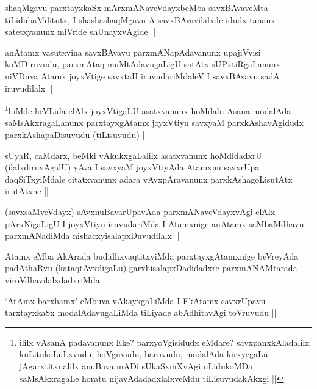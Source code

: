 \begin{artha}
shaqMgavu parxtayxkaSx mArxmANaveVdayxbeMba savxBAvaveMta tiLidubaMditutx, I shashashaqMgavu A savxBAvavilalxde idudx tananx satetxyanunx miVride shUnayxvAgide ||
\end{artha}

\begin{artha}
anAtamx vasutxvina savxBAvavu parxmANapAdavanunx upajiVvisi koMDiruvudu, parxmAtaq muMtAdavugaLigU satAtx sUPxtiRgaLanunx niVDuva Atamx joyxVtige savxtaH iruvudariMdaleV I savxBAvavu sadA iruvudilalx ||
\end{artha}

\begin{artha}
\footnote{ililx vAsanA padavanunx Eke? parxyoVgisidudx eMdare? savxpanxkAladalilx kuLitukoLuLxvudu, hoVguvudu, baruvudu, modalAda kirxyegaLu jAgarxtitxnalilx anuBava mADi sUkaSxmXvAgi uLidukoMDa saMsAkxragaLe horatu nijavAdadadxlalxveMdu tiLisuvudakAkxgi ||}hiMde heVLida elAlx joyxVtigaLU asatxvanunx hoMdalu Asana modalAda saMsAkxragaLanunx parxtayxgAtamx joyxVtiyu savxyaM parxkAshavAgidudx parxkAshapaDisuvudu (tiLisuvudu) ||
\end{artha}

\begin{artha}
sUyaR, caMdarx, beMki vAkukxgaLalilx asatxvanunx hoMdidadxrU (ilalxdiruvAgalU) yAva I savxyaM joyxVtiyAda Atamxnu savxrUpa daqSiTxyiMdale citatxvanunx adara vAyxpAravanunx parxkAshagoLisutAtx irutAtxne ||
\end{artha}

\begin{artha}
(savxsaMveVdayx) sAvxnuBavarUpavAda parxmANaveVdayxvAgi elAlx pArxNigaLigU I joyxVtiyu iruvudariMda I Atamxnige anAtamx saMbaMdhavu parxmANadiMda nishacxyisalapxDuvudilalx ||
\end{artha}

\begin{artha}
Atamx eMba AkArada budidhxvaqtitxyiMda parxtayxgAtamxnige beVreyAda padAthaRvu (kataqtAvxdigaLu) garxhisalapxDadidadxre parxmANAMtarada viroVdhavilalxdadxriMda 
\end{artha}

\begin{artha}
`AtAmx barxhamx' eMbuva vAkayxgaLiMda I EkAtamx savxrUpavu tarxtayxkaSx modalAdavugaLiMda tiLiyade abAdhitavAgi toVruvudu ||             
\end{artha}

